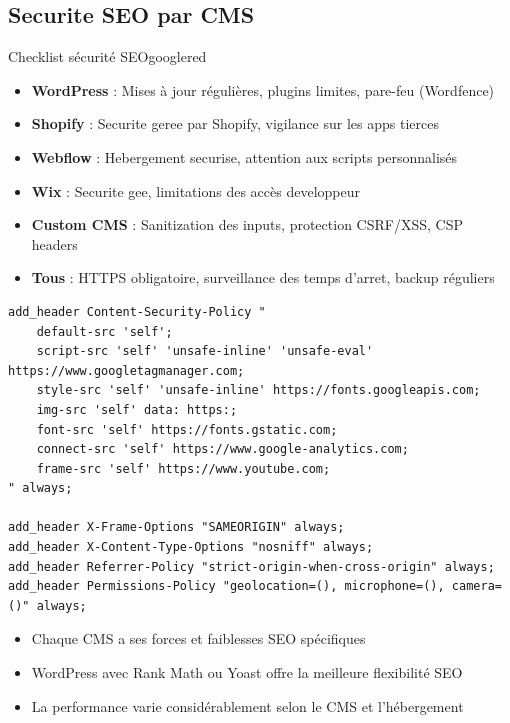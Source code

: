 \documentclass[12pt,a4paper,twoside]{report}
\begin{document}
\subsection{Securite SEO par CMS}

\begin{mybox}{Checklist sécurité SEO}{googlered}
\begin{itemize}
    \item \textbf{WordPress} : Mises à jour régulières, plugins limites, pare-feu (Wordfence)
    \item \textbf{Shopify} : Securite geree par Shopify, vigilance sur les apps tierces
    \item \textbf{Webflow} : Hebergement securise, attention aux scripts personnalisés
    \item \textbf{Wix} : Securite gee, limitations des accès developpeur
    \item \textbf{Custom CMS} : Sanitization des inputs, protection CSRF/XSS, CSP headers
    \item \textbf{Tous} : HTTPS obligatoire, surveillance des temps d'arret, backup réguliers
\end{itemize}
\end{mybox}

\begin{lstlisting}[style=code,caption={En-têtes de sécurité pour un CMS personnalisé (NGINX)}]
add_header Content-Security-Policy "
    default-src 'self';
    script-src 'self' 'unsafe-inline' 'unsafe-eval' https://www.googletagmanager.com;
    style-src 'self' 'unsafe-inline' https://fonts.googleapis.com;
    img-src 'self' data: https:;
    font-src 'self' https://fonts.gstatic.com;
    connect-src 'self' https://www.google-analytics.com;
    frame-src 'self' https://www.youtube.com;
" always;

add_header X-Frame-Options "SAMEORIGIN" always;
add_header X-Content-Type-Options "nosniff" always;
add_header Referrer-Policy "strict-origin-when-cross-origin" always;
add_header Permissions-Policy "geolocation=(), microphone=(), camera=()" always;
\end{lstlisting}


\begin{takeaways}
\begin{itemize}
    \item Chaque CMS a ses forces et faiblesses SEO spécifiques
    \item WordPress avec Rank Math ou Yoast offre la meilleure flexibilité SEO
    \item La performance varie considérablement selon le CMS et l'hébergement
\end{itemize}
\end{takeaways}
\end{document}
